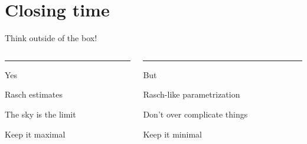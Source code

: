 \documentclass{beamer}
\begin{document}
\section{Closing time}
\begin{frame}
	
	\begin{center}
\Large
		Think outside of the box!
	\end{center}
\vspace{2mm}
\begin{columns}[T] %
	\begin{column}{.50\textwidth}
		\color{template}\rule{\linewidth}{4pt}
		\begin{center}
			\large{Yes}
		\end{center}
	\normalcolor

		Rasch estimates 
		

		\vspace{1.5mm}
		The sky is the limit
		

			\vspace{1.5mm}
		Keep it maximal
	\end{column}%
	\hfill%
	\begin{column}{.50\textwidth}

		\color{but}\rule{\linewidth}{4pt}
		\begin{center}
			\large{But}
		\end{center}
	\normalcolor

		 Rasch-like parametrization
		 
		 	\vspace{1.5mm}
		 Don't over complicate things 
		 

		 	\vspace{1.5mm}
		 Keep it minimal
	\end{column}%
\end{columns}  

	
\pause
	\centering
            
\end{frame}
\end{document}
